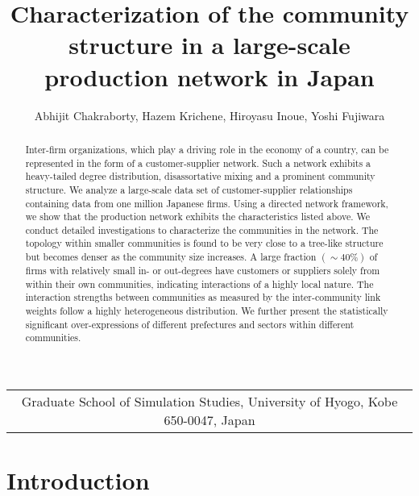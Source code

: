 \documentclass[pre,floatfix,twocolumn,showpacs,a4paper,nofootinbib]{revtex4}
\begin{document}
\title
{Characterization of the community structure in a large-scale production network in Japan}
\author
{
Abhijit Chakraborty, Hazem Krichene, Hiroyasu Inoue, Yoshi Fujiwara  
}
\affiliation
{
\begin {tabular}{c}
Graduate School of Simulation Studies, University of Hyogo, Kobe 650-0047, Japan 
\end{tabular}
}
\begin{abstract}
Inter-firm organizations, which play a driving role in the economy of a country, can be represented in the form of
a customer-supplier network. Such a network exhibits a  heavy-tailed degree distribution, disassortative mixing and 
a prominent community structure. We analyze a large-scale data set of customer-supplier relationships 
containing data from one million Japanese firms. Using a directed network framework,
we show that the production network exhibits the characteristics listed above.
We conduct detailed
investigations to characterize the communities in the network. The topology within smaller communities  
is found to be very close to a tree-like structure but becomes denser as the community size increases. 
A large fraction $(\sim 40\%)$ of firms with relatively small in- or out-degrees have customers or suppliers solely from within their own communities,
indicating interactions of a highly local nature. 
The interaction strengths between communities as measured by the inter-community link weights follow 
a highly heterogeneous distribution. We further present the statistically significant over-expressions
of different prefectures and sectors within different communities. 


\end{abstract}

\maketitle

\section {Introduction}
\end{document}
